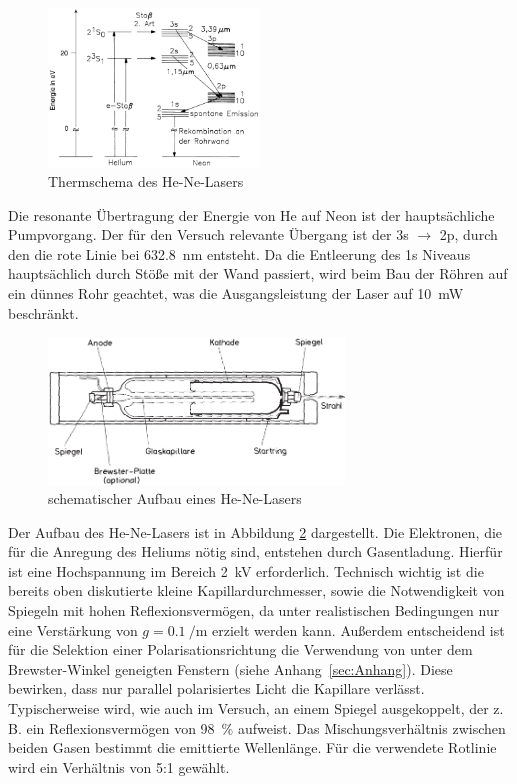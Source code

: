\documentclass[a4paper,twoside,final]{article}
\begin{document}
\begin{figure}[htp]
  \centering
  \includegraphics[width=0.5\textwidth]{Bilder/HeNe-Termschema.pdf}
  \caption{Thermschema des He-Ne-Lasers}
  \label{fig:Termschema}
\end{figure}

Die resonante Übertragung der Energie von He auf Neon ist der hauptsächliche Pumpvorgang. Der für den Versuch relevante Übergang ist der 3s $\rightarrow$ 2p, durch den die rote Linie bei \SI{632,8}{\nano\meter} entsteht. Da die Entleerung des 1s Niveaus hauptsächlich durch Stöße mit der Wand passiert, wird beim Bau der Röhren auf ein dünnes Rohr geachtet, was die Ausgangsleistung der Laser auf \SI{10}{\milli\watt} beschränkt.

\begin{figure}[htp]
  \centering
  \includegraphics[width=0.7\textwidth]{Bilder/HeNe-Laser_Aufbau.pdf}
  \caption{schematischer Aufbau eines He-Ne-Lasers}
  \label{fig:Aufbau}
\end{figure}

Der Aufbau des He-Ne-Lasers ist in Abbildung \ref{fig:Aufbau} dargestellt. Die Elektronen, die für die Anregung des Heliums nötig sind, entstehen durch Gasentladung. Hierfür ist eine Hochspannung im Bereich \SI{2}{\kilo\volt} erforderlich. Technisch wichtig ist die bereits oben diskutierte kleine Kapillardurchmesser, sowie die Notwendigkeit von Spiegeln mit hohen Reflexionsvermögen, da unter realistischen Bedingungen nur eine Verstärkung von $g=\SI{0,1}{\per\meter}$ erzielt werden kann. Außerdem entscheidend ist für die Selektion einer Polarisationsrichtung die Verwendung von unter dem Brewster-Winkel geneigten Fenstern (siehe Anhang~\ref{sec:Anhang}). Diese bewirken, dass nur parallel polarisiertes Licht die Kapillare verlässt. Typischerweise wird, wie auch im Versuch, an einem Spiegel ausgekoppelt, der z.\,B. ein Reflexionsvermögen von \SI{98}{\percent} aufweist. Das Mischungsverhältnis zwischen beiden Gasen bestimmt die emittierte Wellenlänge. Für die verwendete Rotlinie wird ein Verhältnis von 5:1 gewählt.
\end{document}
